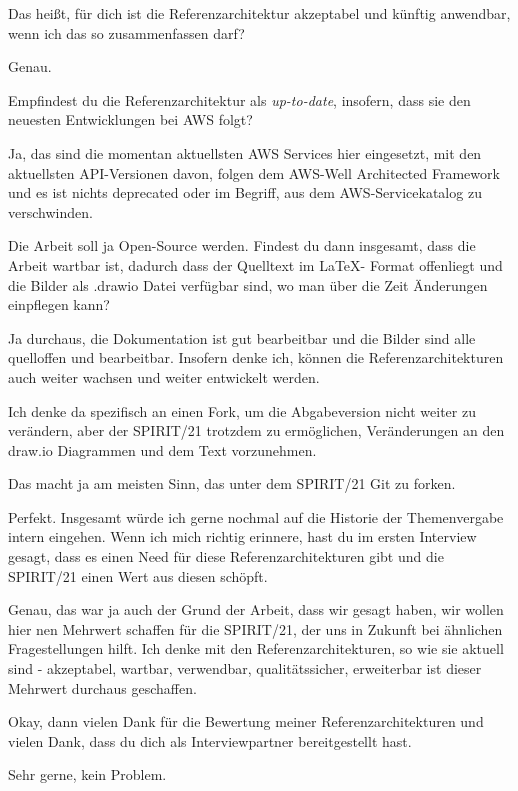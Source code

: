 \LF Das heißt, für dich ist die Referenzarchitektur akzeptabel und künftig anwendbar, wenn ich das so zusammenfassen darf?

\PA Genau.

\LF Empfindest du die Referenzarchitektur als \textit{up-to-date}, insofern, dass sie den neuesten Entwicklungen bei \ac{AWS} folgt?

\PA Ja, das sind die momentan aktuellsten \ac{AWS} Services hier eingesetzt, mit den aktuellsten \ac{API}-Versionen davon, folgen dem \ac{AWS}-Well Architected Framework und es ist nichts deprecated oder im Begriff, aus dem \ac{AWS}-Servicekatalog zu verschwinden.

\LF Die Arbeit soll ja Open-Source werden. Findest du dann insgesamt, dass die Arbeit wartbar ist, dadurch dass der Quelltext im \LaTeX - Format offenliegt und die Bilder als .drawio Datei verfügbar sind, wo man über die Zeit Änderungen einpflegen kann?

\PA Ja durchaus, die Dokumentation ist gut bearbeitbar und die Bilder sind alle quelloffen und bearbeitbar. Insofern denke ich, können die Referenzarchitekturen auch weiter wachsen und weiter entwickelt werden.

\LF Ich denke da spezifisch an einen Fork, um die Abgabeversion nicht weiter zu verändern, aber der SPIRIT/21 trotzdem zu ermöglichen, Veränderungen an den draw.io Diagrammen und dem Text vorzunehmen.

\PA Das macht ja am meisten Sinn, das unter dem SPIRIT/21 Git zu forken.

\LF Perfekt. Insgesamt würde ich gerne nochmal auf die Historie der Themenvergabe intern eingehen. Wenn ich mich richtig erinnere, hast du im ersten Interview gesagt, dass es einen Need für diese Referenzarchitekturen gibt und die SPIRIT/21 einen Wert aus diesen schöpft.

\PA Genau, das war ja auch der Grund der Arbeit, dass wir gesagt haben, wir wollen hier nen Mehrwert schaffen für die SPIRIT/21, der uns in Zukunft bei ähnlichen Fragestellungen hilft. Ich denke mit den Referenzarchitekturen, so wie sie aktuell sind - akzeptabel, wartbar, verwendbar, qualitätssicher, erweiterbar ist dieser Mehrwert durchaus geschaffen.

\LF Okay, dann vielen Dank für die Bewertung meiner Referenzarchitekturen und vielen Dank, dass du dich als Interviewpartner bereitgestellt hast.

\PA Sehr gerne, kein Problem.